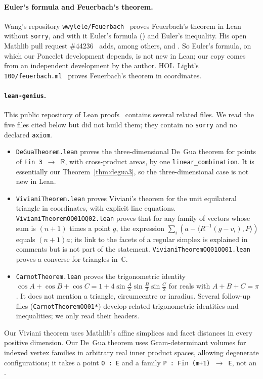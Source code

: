 \documentclass[11pt]{article}
\theoremstyle{definition}
\theoremstyle{remark}
\DeclareRobustCommand\lean[1]{\ifmmode\text{\leanu{#1}}\else\leanu{#1}\fi}
\newcommand{\code}[1]{\texttt{#1}}
\begin{document}
\paragraph{Euler's formula and Feuerbach's theorem.}
Wang's repository \texttt{wwylele/Feuerbach}~\cite{WangFeuerbach} proves Feuerbach's theorem in
Lean without \code{sorry}, and with it Euler's formula () and
Euler's inequality. His open Mathlib pull request \#44236~\cite{PR44236} adds, among others,
 and . So Euler's
formula, on which our Poncelet development depends, is not new in Lean; our copy comes from an
independent development by the author. HOL~Light's \texttt{100/feuerbach.ml}~\cite{HOLLight} proves
Feuerbach's theorem in coordinates.

\paragraph{\texttt{lean-genius}.}
This public repository of Lean proofs~\cite{LeanGenius} contains several related files. We read
the five files cited below but did not build them; they contain no \code{sorry} and no declared
\code{axiom}.
\begin{itemize}
\item \texttt{DeGuaTheorem.lean} proves the three-dimensional De~Gua theorem for points of
\code{Fin 3 $\to$ $\mathbb{R}$}, with cross-product areas, by one \code{linear\_combination}. It is essentially our
Theorem~\ref{thm:degua3}, so the three-dimensional case is not new in Lean.
\item \texttt{VivianiTheorem.lean} proves Viviani's theorem for the unit equilateral triangle in
coordinates, with explicit line equations. \texttt{VivianiTheoremOQ01OQ02.lean} proves that for
any family of vectors whose sum is $(n+1)$ times a point $g$, the expression
$\sum_i(a-\langle R^{-1}(g-v_i),P\rangle)$ equals $(n+1)a$; its link to the facets of a regular
simplex is explained in comments but is not part of the statement. \texttt{VivianiTheoremOQ01OQ01.lean}
proves a converse for triangles in~$\mathbb C$.
\item \texttt{CarnotTheorem.lean} proves the trigonometric identity
$\cos A+\cos B+\cos C=1+4\sin\frac A2\sin\frac B2\sin\frac C2$ for reals with $A+B+C=\pi$. It does not
mention a triangle, circumcentre or inradius. Several follow-up files (\texttt{CarnotTheoremOQ01*})
develop related trigonometric identities and inequalities; we only read their headers.
\end{itemize}
Our Viviani theorem uses Mathlib's affine simplices and facet distances in every positive
dimension. Our De~Gua theorem uses Gram-determinant volumes for indexed vertex families in
arbitrary real inner product spaces, allowing degenerate configurations; it takes a point
\code{O : E} and a family \code{P : Fin (m+1) $\to$ E}, not an \lean{Affine.Simplex}.
\end{document}
